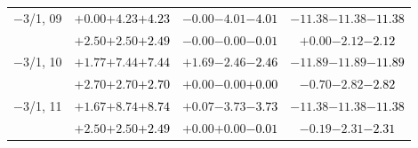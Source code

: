 \documentclass[compress]{beamer}
\begin{document}
\begin{frame}
\begin{tabular}{r | c | c | c}
$-$3/1, 09 & $+0.00$\hspace{0.1 cm}$+4.23$\hspace{0.1 cm}\textcolor{black}{$+4.23$} & $-0.00$\hspace{0.1 cm}$-4.01$\hspace{0.1 cm}\textcolor{black}{$-4.01$} & $-11.38$\hspace{0.1 cm}$-11.38$\hspace{0.1 cm}\textcolor{black}{$-11.38$} \\
           & $+2.50$\hspace{0.1 cm}$+2.50$\hspace{0.1 cm}\textcolor{black}{$+2.49$} & $-0.00$\hspace{0.1 cm}$-0.00$\hspace{0.1 cm}\textcolor{black}{$-0.01$} & $+0.00$\hspace{0.1 cm}$-2.12$\hspace{0.1 cm}\textcolor{black}{$-2.12$} \\
$-$3/1, 10 & $+1.77$\hspace{0.1 cm}$+7.44$\hspace{0.1 cm}\textcolor{black}{$+7.44$} & $+1.69$\hspace{0.1 cm}$-2.46$\hspace{0.1 cm}\textcolor{black}{$-2.46$} & $-11.89$\hspace{0.1 cm}$-11.89$\hspace{0.1 cm}\textcolor{black}{$-11.89$} \\
           & $+2.70$\hspace{0.1 cm}$+2.70$\hspace{0.1 cm}\textcolor{black}{$+2.70$} & $+0.00$\hspace{0.1 cm}$-0.00$\hspace{0.1 cm}\textcolor{black}{$+0.00$} & $-0.70$\hspace{0.1 cm}$-2.82$\hspace{0.1 cm}\textcolor{black}{$-2.82$} \\
$-$3/1, 11 & $+1.67$\hspace{0.1 cm}$+8.74$\hspace{0.1 cm}\textcolor{black}{$+8.74$} & $+0.07$\hspace{0.1 cm}$-3.73$\hspace{0.1 cm}\textcolor{black}{$-3.73$} & $-11.38$\hspace{0.1 cm}$-11.38$\hspace{0.1 cm}\textcolor{black}{$-11.38$} \\
           & $+2.50$\hspace{0.1 cm}$+2.50$\hspace{0.1 cm}\textcolor{black}{$+2.49$} & $+0.00$\hspace{0.1 cm}$+0.00$\hspace{0.1 cm}\textcolor{black}{$-0.01$} & $-0.19$\hspace{0.1 cm}$-2.31$\hspace{0.1 cm}\textcolor{black}{$-2.31$} \\

\end{tabular}
\end{frame}
\end{document}
